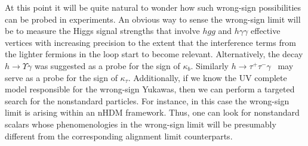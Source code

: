 \documentclass[11pt]{article}
\def\Eqn#1{Eq.\ (\ref{#1})}
\begin{document}



At this point it will be quite natural to wonder how such
wrong-sign possibilities can be probed in experiments. An obvious way to sense the
wrong-sign limit will be to measure the Higgs signal strengths that involve $hgg$
and $h\gamma\gamma$ effective vertices with increasing precision to the extent
that the interference terms from the lighter fermions in the loop start to become
relevant. Alternatively, the decay $h\to\Upsilon\gamma$ was suggested as a probe
for the sign of $\kappa_b$\cite{Modak:2016cdm,Batra:2022wsd}. Similarly $h\to \tau^+\tau^-\gamma$~\cite{Galon:2016ngp} may 
serve as a probe for the sign of $\kappa_\tau$.
%
Additionally, if we know the UV complete model responsible for the wrong-sign Yukawas,
then we can perform a targeted search for the nonstandard particles. For instance,
in this case the wrong-sign limit is arising within an nHDM framework. Thus, one can
look for nonstandard scalars whose phenomenologies in the wrong-sign limit will be
presumably different from the corresponding alignment limit counterparts\cite{Kanemura:2022cth}.
\end{document}
